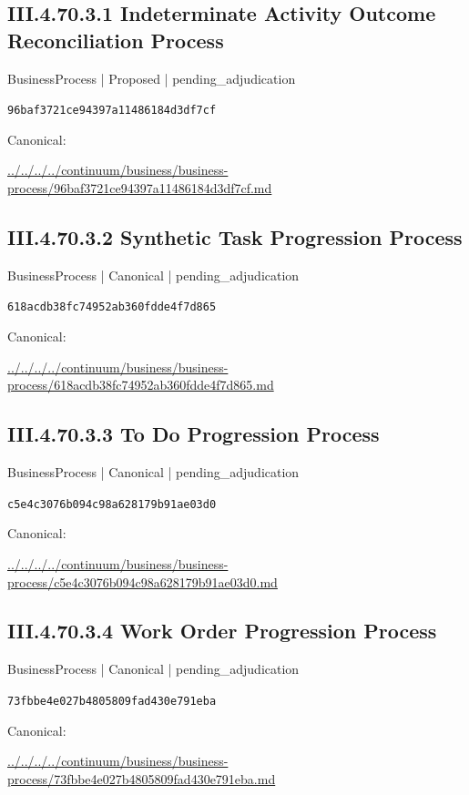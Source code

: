 \documentclass[10pt,a4paper]{article}
\begin{document}
\subsection*{III.4.70.3.1 Indeterminate Activity Outcome Reconciliation Process}
{\small BusinessProcess | Proposed | pending\_adjudication}\par
\texttt{96baf3721ce94397a11486184d3df7cf}\par
Canonical: \par
{\footnotesize\url{../../../../continuum/business/business-process/96baf3721ce94397a11486184d3df7cf.md}}\par
\subsection*{III.4.70.3.2 Synthetic Task Progression Process}
{\small BusinessProcess | Canonical | pending\_adjudication}\par
\texttt{618acdb38fc74952ab360fdde4f7d865}\par
Canonical: \par
{\footnotesize\url{../../../../continuum/business/business-process/618acdb38fc74952ab360fdde4f7d865.md}}\par
\subsection*{III.4.70.3.3 To Do Progression Process}
{\small BusinessProcess | Canonical | pending\_adjudication}\par
\texttt{c5e4c3076b094c98a628179b91ae03d0}\par
Canonical: \par
{\footnotesize\url{../../../../continuum/business/business-process/c5e4c3076b094c98a628179b91ae03d0.md}}\par
\subsection*{III.4.70.3.4 Work Order Progression Process}
{\small BusinessProcess | Canonical | pending\_adjudication}\par
\texttt{73fbbe4e027b4805809fad430e791eba}\par
Canonical: \par
{\footnotesize\url{../../../../continuum/business/business-process/73fbbe4e027b4805809fad430e791eba.md}}\par
\end{document}
